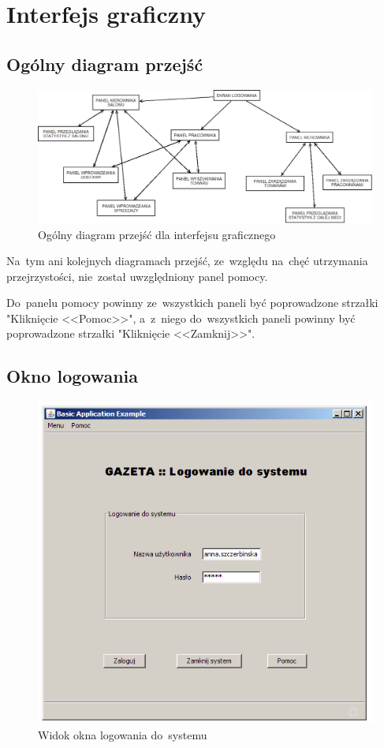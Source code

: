 \section{Interfejs graficzny}
\subsection{Ogólny diagram przejść}
\begin{figure}[h]
\begin{center}
\includegraphics[width=1\textwidth]{gfx/diagram_przejsc.png}
\caption{Ogólny diagram przejść dla interfejsu graficznego}
\end{center}
\end{figure}
Na~tym ani kolejnych diagramach przejść, ze~względu na~chęć utrzymania przejrzystości, nie~został uwzględniony panel pomocy.

Do~panelu pomocy powinny ze~wszystkich paneli być poprowadzone strzałki "Kliknięcie <<Pomoc>>", a~z~niego do~wszystkich paneli powinny być poprowadzone strzałki "Kliknięcie <<Zamknij>>".
\clearpage
\subsection{Okno logowania}
\begin{figure}[h]
\includegraphics[width=1\textwidth]{gfx/logowanie.png}
\caption{Widok okna logowania do~systemu}
\end{figure}
\clearpage

